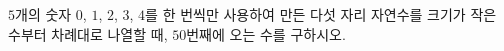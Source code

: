 $5$개의 숫자 $0$, $1$, $2$, $3$, $4$를 한 번씩만 사용하여 만든 다섯 자리 자연수를 크기가 작은 수부터 차례대로 나열할 때, \mbox{$50$번째에} 오는 수를 구하시오.
